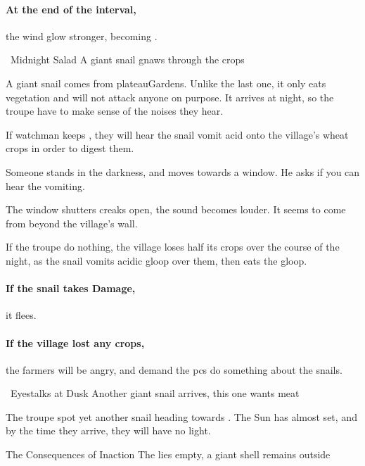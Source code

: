\paragraph{At the end of the \gls{interval},}
the wind glow stronger, becoming .

{~Midnight Salad}%
{A giant snail gnaws through the crops}%

A giant snail comes from \gls{plateauGardens}.
Unlike the last one, it only eats vegetation and will not attack anyone on purpose.
It arrives at night, so the troupe have to make sense of the noises they hear.

If  watchman keeps , they will hear the snail vomit acid onto the \gls{village}'s wheat crops in order to digest them.

\begin{boxtext}
  Someone stands in the darkness, and moves towards a window.
  He asks if you can hear the vomiting.

  The window shutters creaks open, the sound becomes louder.
  It seems to come from beyond the \gls{village}'s wall.
\end{boxtext}

If the troupe do nothing, the \gls{village} loses half its crops over the course of the night, as the snail vomits acidic gloop over them, then eats the gloop.

\paragraph{If the snail takes Damage,}
it flees.

\paragraph{If the \gls{village} lost any crops,}
the farmers will be angry, and demand the \glspl{pc} do something about the snails.

{~Eyestalks at Dusk}%
{Another giant snail arrives, this one wants meat}%

The troupe spot yet another snail heading towards .
The Sun has almost set, and by the time they arrive, they will have no light.

{The Consequences of Inaction}%
{The  lies empty, a giant shell remains outside}%

